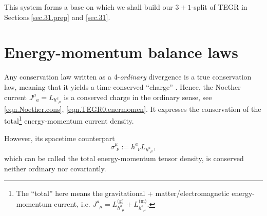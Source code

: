\documentclass[
10pt, %
a4paper, %
oneside, %
headinclude,footinclude, %
BCOR5mm, %
]{scrartcl}
\newcommand{\pd}[1]{\partial_{#1}}
\newcommand{\tetrsymbol}{h}
\newcommand{\tetr}[2]{\tetrsymbol^{#1}_{\phantom{#1}#2}}
\newcommand{\D}[1]{\partial_{#1}} %
\newcommand{\Tors}[2]{T^{#1}_{\phantom{a}#2}}
\newcommand{\Laghodge}{L}%
\newcommand{\EMmat}[2]{\sigma^{#1}_{\ \,#2}}
\newcommand{\LCsymb}{\bm{\in}}    %
\newcommand{\HDT}[1]{\accentset{\star}{T}^{#1}}
\newcommand{\NC}[2]{J^{#2}_{\phantom{#2}#1}}
\begin{document}
This system forms a base on which we shall build our $ 3+1 $-split of TEGR in 
Sections\,\ref{sec.31.prep} and \ref{sec.31}.






\section{Energy-momentum balance laws}

Any conservation law written as a  4-\emph{ordinary} divergence is a
true conservation law, meaning that it yields a time-conserved 
``charge'' \cite{AldrovandiPereiraBook}. Hence, the Noether current $ \NC{a}{\mu} 
=\Laghodge_{\tetr{a}{\mu}}$ is a conserved charge in the ordinary sense, see 
\eqref{eqn.Noether.cons}, \eqref{eqn.TEGR0.enermomen}. It expresses the conservation of the 
total\footnote{The ``total'' here 
means the gravitational + matter/electromagnetic energy-momentum current, i.e. $ 
	\NC{\mu}{a} = \Laghodge^\text{(g)}_{\tetr{a}{\mu}} + \Laghodge^\text{(m)}_{\tetr{a}{\mu}} $.} 
	energy-momentum current density. 

However, its spacetime counterpart 
\begin{equation}\label{eqn.stress}
	\EMmat{\mu}{\nu}:=\tetr{a}{\nu} L_{\tetr{a}{\mu}},
\end{equation}
which can be called the total energy-momentum tensor density, is conserved 
neither ordinary nor covariantly.
\end{document}
